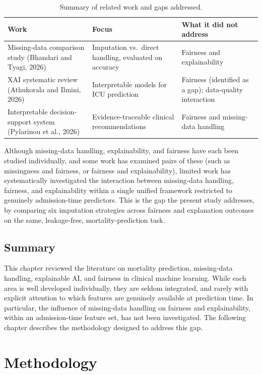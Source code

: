 \documentclass[12pt,a4paper]{report}
\begin{document}
\begin{table}[H]
\centering
\caption{Summary of related work and gaps addressed.}
\label{tab:gap-summary}
\small
\renewcommand{\arraystretch}{1.4}
\begin{tabular}{p{3.6cm}p{3.6cm}p{4.6cm}}
\toprule
Work & Focus & What it did not address \\
\midrule
Missing-data comparison study (Bhandari and Tyagi, 2026) & Imputation vs.\ direct handling, evaluated on accuracy & Fairness and explainability \\
\addlinespace
XAI systematic review (Athukorala and Ilmini, 2026) & Interpretable models for ICU prediction & Fairness (identified as a gap); data-quality interaction \\
\addlinespace
Interpretable decision-support system (Pylarinou et al., 2026) & Evidence-traceable clinical recommendations & Fairness and missing-data handling \\
\bottomrule
\end{tabular}
\renewcommand{\arraystretch}{1.0}
\end{table}


Although missing-data handling, explainability, and fairness have each been studied individually, and some work has examined pairs of these (such as missingness and fairness, or fairness and explainability), limited work has systematically investigated the interaction between missing-data handling, fairness, and explainability within a single unified framework restricted to genuinely admission-time predictors. This is the gap the present study addresses, by comparing six imputation strategies across fairness and explanation outcomes on the same, leakage-free, mortality-prediction task.


\section{Summary}
This chapter reviewed the literature on mortality prediction, missing-data handling, explainable AI, and fairness in clinical machine learning. While each area is well developed individually, they are seldom integrated, and rarely with explicit attention to which features are genuinely available at prediction time. In particular, the influence of missing-data handling on fairness and explainability, within an admission-time feature set, has not been investigated. The following chapter describes the methodology designed to address this gap.


\chapter{Methodology}
\end{document}
